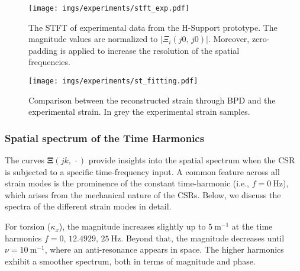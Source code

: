 
%     
\begin{figure*}
    \centering
    \texttt{[image: imgs/experiments/stft\_exp.pdf]}
    \caption{The \ac{STFT} of experimental data from the H-Support prototype. The magnitude values are normalized to $|\Xi_i(j 0, \, j 0)|$. Moreover, zero-padding is applied to increase the resolution of the spatial frequencies.}
    \label{fig:stft_exp}
\end{figure*}
%     
\begin{figure*}
    \centering
    \texttt{[image: imgs/experiments/st\_fitting.pdf]}
    \caption{Comparison between the reconstructed strain through \ac{BPD} and the experimental strain. In grey the experimental strain samples.}
    \label{fig:bpd_st}
\end{figure*}

\subsubsection{Spatial spectrum of the Time Harmonics}
The curves \(\bm{\Xi}(jk, \, \cdot)\) provide insights into the spatial spectrum when the \ac{CSR} is subjected to a specific time-frequency input. A common feature across all strain modes is the prominence of the constant time-harmonic (i.e., \(f = \SI{0}{\hertz}\)), which arises from the mechanical nature of the \acp{CSR}. Below, we discuss the spectra of the different strain modes in detail.

For torsion ($\kappa_x$), the magnitude increases slightly up to $\SI{5}{\meter^{-1}}$ at the time harmonics $f = 0, \, 12.4929, \, \SI{25}{\hertz}$. Beyond that, the magnitude decreases until $\nu = \SI{10}{\meter^{-1}}$, where an anti-resonance appears in space. The higher harmonics exhibit a smoother spectrum, both in terms of magnitude and phase.

